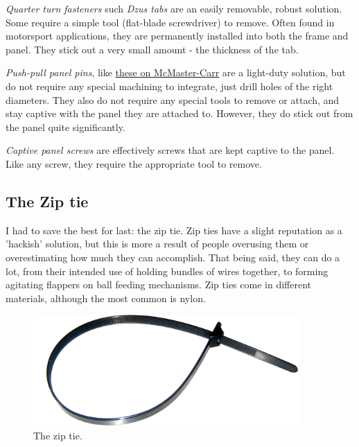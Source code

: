 \documentclass[10pt,letterpaper]{book}
\begin{document}
	\begin{asparaenum}[a)]
		\item \textit{Quarter turn fasteners} such \textit{Dzus tabs} are an easily removable, robust solution. Some require a simple tool (flat-blade screwdriver) to remove. Often found in motorsport applications, they are permanently installed into both the frame and panel. They stick out a very small amount - the thickness of the tab.
		\item \textit{Push-pull panel pins}, like \href{https://www.mcmaster.com/panel-fasteners/screws-and-bolts/push-pull-captive-panel-screws/}{\color{red}\underline{these on McMaster-Carr}} are a light-duty solution, but do not require any special machining to integrate, just drill holes of the right diameters. They also do not require any special tools to remove or attach, and stay captive with the panel they are attached to. However, they do stick out from the panel quite significantly.
		\item \textit{Captive panel screws} are effectively screws that are kept captive to the panel. Like any screw, they require the appropriate tool to remove.
	\end{asparaenum}
	
	\subsection{The Zip tie}
	I had to save the best for last: the zip tie. Zip ties have a slight reputation as a 'hackish' solution, but this is more a result of people overusing them or overestimating how much they can accomplish. That being said, they can do a lot, from their intended use of holding bundles of wires together, to forming agitating flappers on ball feeding mechanisms. Zip ties come in different materials, although the most common is nylon.
	
	\begin{figure}[H]
		\includegraphics[width=0.9\textwidth]{imgs/ziptie.png}
		\caption{The zip tie.}
	\end{figure}
	
\end{document}
